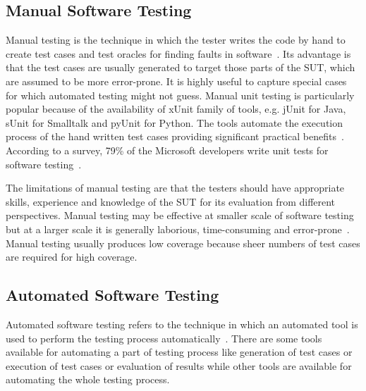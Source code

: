
\subsection{Manual Software Testing}
Manual testing is the technique in which the tester writes the code by hand to create test cases and test oracles for finding faults in software~\cite{ciupa2008finding}. Its advantage is that the test cases are usually generated to target those parts of the SUT, which are assumed to be more error-prone. It is highly useful to capture special cases for which automated testing might not guess. Manual unit testing is particularly popular because of the availability of xUnit family of tools, e.g. jUnit for Java, sUnit for Smalltalk and pyUnit for Python. The tools automate the execution process of the hand written test cases providing significant practical benefits~\cite{leitner2007reconciling}. According to a survey, 79\% of the Microsoft developers write unit tests for software testing~\cite{venolia2005software}. 

The limitations of manual testing are that the testers should have appropriate skills, experience and knowledge of the SUT for its evaluation from different perspectives. Manual testing may be effective at smaller scale of software testing but at a larger scale it is generally laborious, time-consuming and error-prone~\cite{tretmans2000automatic}. Manual testing usually produces low coverage because sheer numbers of test cases are required for high coverage.


 
\subsection{Automated Software Testing}
Automated software testing refers to the technique in which an automated tool is used to perform the testing process automatically~\cite{leitner2007reconciling}. There are some tools available for automating a part of testing process like generation of test cases or execution of test cases or evaluation of results while other tools are available for automating the whole testing process. 

